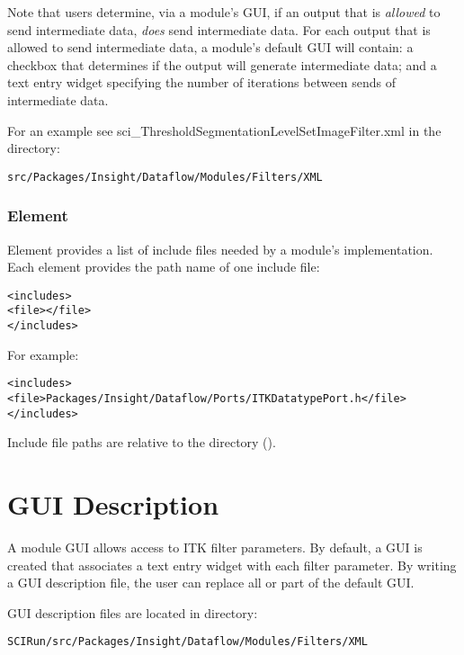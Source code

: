 Note that users determine, via a module's GUI, if an output that is
\emph{allowed} to send intermediate data, \emph{does} send
intermediate data.  For each output that is allowed to send
intermediate data, a module's default GUI will contain: a checkbox
that determines if the output will generate intermediate data; and a
text entry widget specifying the number of iterations between
sends of intermediate data.

For an example see sci_ThresholdSegmentationLevelSetImageFilter.xml in
the directory:

\begin{alltt}
  src/Packages/Insight/Dataflow/Modules/Filters/XML
\end{alltt}

\subsubsection{Element }

Element  provides a list of include files needed
by a module's implementation.  Each  element
provides the path name of one include file:

\begin{alltt}
  <includes>
    <file></file>
    \velide
  </includes>
\end{alltt}

For example:

\begin{alltt}
  <includes>
    <file>Packages/Insight/Dataflow/Ports/ITKDatatypePort.h</file>
  </includes>
\end{alltt}

Include file paths are relative to the \sr{}  directory
().

\section{\sr{} GUI Description}
\label{sec:itk_mods:sr_gui_desc}

A module GUI allows access to ITK filter parameters.  By default, a
GUI is created that associates a text entry widget with each filter
parameter.  By writing a GUI description file, the user can replace
all or part of the default GUI.  

\sr{} GUI description files are located in directory:

\begin{alltt}
  SCIRun/src/Packages/Insight/Dataflow/Modules/Filters/XML
\end{alltt}


